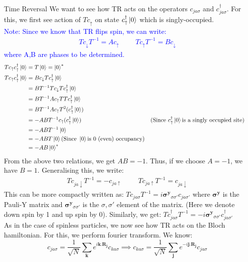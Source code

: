 \documentclass[12pt, oneside, listof=totoc,dvipsnames]{scrbook}
\begin{document}
\begin{chapter}{Time Reversal}
		\noindent
		We want to see how TR acts on the operators $c_{ja\sigma}$ and $c^\dagger_{ja\sigma}$. For this, we first see action of $Tc_\uparrow$ on state $c^\dagger_\uparrow \ket{0}$ which is singly-occupied.\\[0.4cm]
		\textcolor{blue}{Note: Since we know that TR flips spin, we can write: \begin{align*}
				Tc_\downarrow T^{-1}=Ac_\uparrow \hspace{1cm}  Tc_\uparrow T^{-1}=Bc_\downarrow  
			\end{align*} where A,B are phases to be determined.}
		\vspace*{1cm}
		\begin{align*}
			Tc_\uparrow c^\dagger_\uparrow \ket{0} &= T \ket{0} = \ket{0}^* \\ Tc_\uparrow c^\dagger_\uparrow \ket{0} &= Bc_\downarrow T c^\dagger_\uparrow \ket{0}\\ 
			&=B T^{-1} T c_\downarrow T c^\dagger_\uparrow \ket{0}\\
			&=B T^{-1}A c_\uparrow T T c^\dagger_\uparrow \ket{0}\\
			&=B T^{-1}A c_\uparrow T^2 (c^\dagger_\uparrow \ket{0})\\
			&=-AB T^{-1} c_\uparrow (c^\dagger_\uparrow \ket{0}) &&(\text{Since } c^\dagger_\uparrow \ket{0} \text{is a singly occupied site})\\
			&=-AB T^{-1}\ket{0}\\
			&=-ABT\ket{0} (\text{Since } \ket{0} \text{is 0 (even) occupancy})\\
			&=-AB\ket{0}^*
		\end{align*}
		From the above two relations, we get $AB=-1$. Thus, if we choose $A=-1$, we have $B=1$. Generalising this, we write: 
		\begin{align*}
			\boxed{ Tc_{ja\downarrow} T^{-1}=-c_{ja\uparrow} \hspace{1cm}  Tc_{ja\uparrow} T^{-1}=c_{ja\downarrow } }
		\end{align*} 
		This can be more compactly written as: $Tc_{ja\sigma} T^{-1}=i \mathbf{\sigma^y}_{\sigma\sigma'} c_{ja\sigma'}$ where $\mathbf{\sigma^y}$ is the Pauli-Y matrix and $\mathbf{\sigma^y}_{\sigma\sigma'}$ is the $\sigma, \sigma'$ element of the matrix. (Here we denote down spin by 1 and up spin by 0). Similarly, we get: $Tc^\dagger_{ja\sigma} T^{-1}=-i \mathbf{\sigma^y}_{\sigma\sigma'} c^\dagger_{ja\sigma'}$ \\[0.5cm]
		As in the case of spinless particles, we now see how TR acts on the Bloch hamiltonian. For this, we perform fourier transform. We know: 
		\[c_{ja\sigma}=\frac{1}{\sqrt{N}} \sum \limits_\mathbf{k}e^{i\mathbf{k.R_j}}c_{ka\sigma} \implies c_{ka\sigma}=\frac{1}{\sqrt{N}} \sum \limits_\mathbf{j}e^{-i\mathbf{j.R_j}}c_{ja\sigma} \]
		

\end{chapter}
\end{document}
